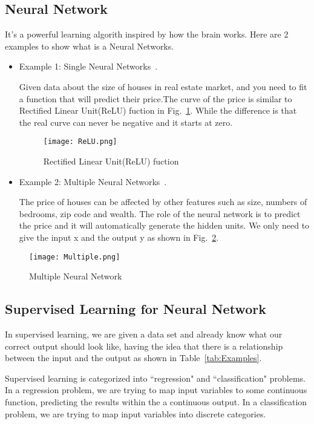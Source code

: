 \documentclass[a4paper]{article}
\begin{document}
\subsection{Neural Network}
It's a powerful learning algorith inspired by how the brain works. Here are 2 examples to show what is a Neural Networks.
\begin{itemize}
\item Example 1: Single Neural Networks~\cite{mooc.com}.\par 
Given data about the size of houses in real estate market, and you need to fit a function that will predict their price.The curve of the price is similar to Rectified Linear Unit(ReLU) fuction in Fig.~\ref{fig:ReLU}. While the difference is that the real curve can never be negative and it starts at zero.

\begin{figure}[!htp]
\begin{center}
   \texttt{[image: ReLU.png]}
\end{center}
   \caption{Rectified Linear Unit(ReLU) fuction}
\label{fig:ReLU}
\end{figure}

\item Example 2: Multiple Neural Networks~\cite{mooc.com}.\par
The price of houses can be affected by other features such as size, numbers of bedrooms, zip code and wealth. The role of the neural network is to predict the price and it will automatically generate the hidden units. We only need to give the input x and the output y as shown in Fig.~\ref{fig:Multiple}.
\end{itemize}

\begin{figure}[!htp]
\begin{center}
   \texttt{[image: Multiple.png]}
\end{center}
   \caption{Multiple Neural Network~\cite{Coursera.org}}
\label{fig:Multiple}
\end{figure}


\subsection{Supervised Learning for Neural Network}
In supervised learning, we are given a data set and already know what our correct output should look like, having the idea that there is a relationship between the input and the output as shown in Table~\ref{tab:Examples}.\par
Supervised learning is categorized into ``regression" and ``classification" problems. In a regression problem, we are trying to map input variables to some continuous function, predicting the results within the a continuous output. In a classification problem, we are trying to map input variables into discrete categories.\par
\end{document}
